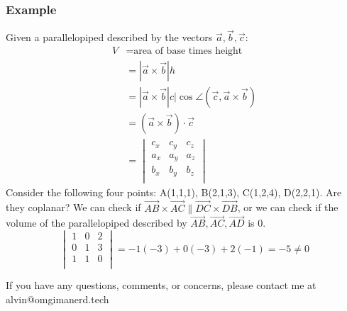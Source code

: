 \documentclass[letterpaper, 12pt]{math}
\begin{document}
\subsubsection*{Example}
Given a parallelopiped described by the vectors \( \vec{a},\vec{b},\vec{c} \):
\begin{align*}
V &= \text{area of base times height} \\
  &= |\vec{a}\times\vec{b}|h \\
  &= |\vec{a}\times\vec{b}|c|\cos\angle(\vec{c},\vec{a}\times\vec{b}) \\
  &= (\vec{a}\times\vec{b})\cdot\vec{c} \\
  &= \begin{vmatrix}
  c_{x} & c_{y} & c_{z} \\
  a_{x} & a_{y} & a_{z} \\
  b_{x} & b_{y} & b_{z} \\
  \end{vmatrix}
\end{align*}
Consider the following four points: A(1,1,1), B(2,1,3), C(1,2,4), D(2,2,1). Are
they coplanar? We can check if \( \vec{AB}\times\vec{AC}\parallel
\vec{DC}\times\vec{DB} \), or we can check if the volume of the parallelopiped
described by \( \vec{AB},\vec{AC},\vec{AD} \) is 0.
\[ \begin{vmatrix}
  1 & 0 & 2 \\
  0 & 1 & 3 \\
  1 & 1 & 0 \\
\end{vmatrix} = -1(-3)+0(-3)+2(-1) = -5 \ne 0 \]

\begin{center}
  If you have any questions, comments, or concerns, please contact me at
  alvin@omgimanerd.tech
\end{center}
\end{document}
